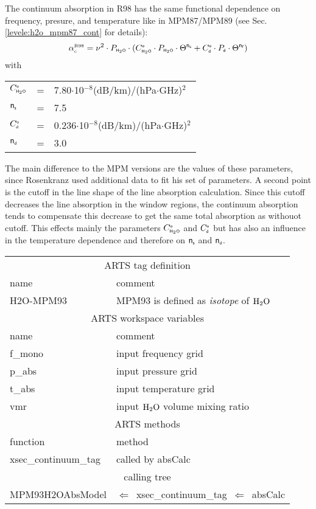 {The continuum absorption in R98 has the same functional dependence on frequency,
presure, and temperature like in MPM87/MPM89 (see Sec. \ref{levele:h2o_mpm87_cont}
for details):
\begin{equation} 
  \label{eq:r98:cont}
  \alpha^{\mbox{\tiny \rm R98}}_{\mbox{\tiny c}} = \nu^2 \cdot P_{\mbox{\tiny \sf H}_{2}\mbox{\tiny \sf O}} \cdot 
               (C^{\mbox{\tiny \sf o}}_{\mbox{\tiny \sf H}_{2}\mbox{\tiny \sf O}} \cdot P_{\mbox{\tiny \sf H}_{2}\mbox{\tiny \sf O}} \cdot \Theta^{{\sf n}_{\mbox{\tiny \sf s}}} + 
                C^{\mbox{\tiny \sf o}}_{\mbox{\tiny \sf d}} \cdot P_{\mbox{\tiny \sf d}}  \cdot \Theta^{{\sf n}_{\mbox{\tiny \sf f}}})
\end{equation}
with\\
\begin{tabular}{lcl}
$C^{\mbox{\tiny \sf o}}_{\mbox{\tiny \sf H}_{2}\mbox{\tiny \sf O}}$   & = & 7.80$\cdot$10$^{-8}$(dB/km)/(hPa$\cdot$GHz)$^2$\\
${\sf n}_{\mbox{\tiny \sf s}}$    & = & 7.5\\
$C^{\mbox{\tiny \sf o}}_{\mbox{\tiny \sf d}}$   & = & 0.236$\cdot$10$^{-8}$(dB/km)/(hPa$\cdot$GHz)$^2$\\
${\sf n}_{\mbox{\tiny \sf d}}$    & = & 3.0\\
\end{tabular}
The main difference to the MPM versions are the values of these 
parameters, since Rosenkranz used additional data to fit his set of 
parameters. A second point is the cutoff in the line shape of the line 
absorption calculation. Since this cutoff decreases the line absorption 
in the window regions, the continuum absorption tends to compensate this 
decrease to get the same total absorption as withouot cutoff. This effects 
mainly the parameters $C^{\mbox{\tiny \sf o}}_{\mbox{\tiny \sf H}_{2}\mbox{\tiny \sf O}}$ and $C^{\mbox{\tiny \sf o}}_{\mbox{\tiny \sf d}}$ but has also an influence in the 
temperature dependence and therefore on ${\sf n}_{\mbox{\tiny \sf s}}$ and ${\sf n}_{\mbox{\tiny \sf d}}$.
%
%
\begin{center}
\begin{tabular}{ll}
\hline
\multicolumn{2}{c}{ARTS tag definition}\\
name      & comment \\
H2O-MPM93 & MPM93 is defined as {\it isotope} of $\mbox{H}_2\mbox{O}$\\
\hline
\multicolumn{2}{c}{ARTS workspace variables}\\
name & comment \\
 f\_mono & input frequency grid \\
 p\_abs  & input pressure grid \\
 t\_abs  & input temperature grid\\
 vmr    & input $\mbox{H}_2\mbox{O}$ volume mixing ratio\\
\hline
\multicolumn{2}{c}{ARTS methods}\\
function           & method\\
xsec\_continuum\_tag & called by absCalc \\
\hline
\multicolumn{2}{c}{calling tree}\\
MPM93H2OAbsModel & $\Leftarrow$~xsec\_continuum\_tag~$\Leftarrow$~absCalc\\
\end{tabular}
\end{center}

}

